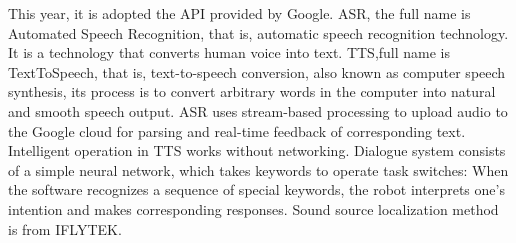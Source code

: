 This year, it is adopted the API provided by Google. ASR, the full name is Automated Speech Recognition, that is, automatic speech recognition technology. 
It is a technology that converts human voice into text. 
TTS,full name is TextToSpeech, that is, text-to-speech conversion, also known as computer speech synthesis, its process is to convert arbitrary words in the computer into natural and smooth speech output.            ASR uses stream-based processing to upload audio to the Google cloud for parsing and real-time feedback of corresponding text.
Intelligent operation in TTS works without networking. Dialogue system consists of a simple neural network, which takes keywords to operate task switches: When the software recognizes a sequence of special keywords, the robot interprets one's intention and makes corresponding responses. 
Sound source localization method is from IFLYTEK. 